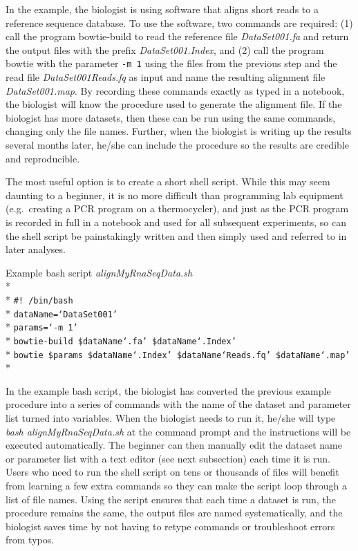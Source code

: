 \documentclass[ChapterTOCs,krantz2]{krantz} %
\begin{document}
In the example, the biologist is using software that aligns short reads
to a reference sequence database.  To use the software, two commands are required:
(1) call the program bowtie-build to read the reference file
\emph{DataSet001.fa} and
return the output files with the prefix \emph{DataSet001.Index},
and (2) call the program bowtie with the parameter \texttt{-m 1} using the files from the
previous step and the read file \emph{DataSet001Reads.fq} as input and name the
resulting alignment file \emph{DataSet001.map}.  By recording these commands exactly
as typed in a notebook, the biologist will know the procedure used to generate
the alignment file.  If the biologist has more datasets, then these can be run
using the same commands, changing only the file names.  Further, when the
biologist is writing up the results several months later, he/she can include
the procedure so the results are credible and reproducible.

The most useful option is to create a short shell script.  While this may seem
daunting to a beginner, it is no more difficult than programming lab
equipment (e.g.\ creating a PCR program on a thermocycler), and just as the PCR
program is recorded in full in a notebook and used for all subsequent
experiments, so can the shell script be painstakingly written and then simply
used and referred to in later analyses.  


Example bash script \emph{alignMyRnaSeqData.sh}\\* \\*
\texttt{\#! /bin/bash}\\*
\texttt{dataName=`DataSet001'}\\*
\texttt{params=`-m 1'}\\*
\texttt{bowtie-build \$dataName`.fa' \$dataName`.Index'}\\*
\texttt{bowtie \$params \$dataName`.Index' \$dataName`Reads.fq' \$dataName`.map' }\\*

In the example bash script, the biologist has converted the
previous example procedure into a series of commands with the name of the
dataset and parameter list turned into variables.  When the biologist needs
to run it, he/she will type \emph{bash alignMyRnaSeqData.sh} at the command prompt and
the instructions will be executed automatically.  The beginner can then
manually edit the dataset name or parameter list with a text editor (see next
subsection) each time it is run.  Users who
need to run the shell script on tens or thousands of files
will benefit from learning a few extra commands so they can make the script
loop through a list of file names.  Using the script ensures that each time a
dataset is run, the procedure remains the same, the output files are named
systematically, and the biologist saves time by not having to retype commands
or troubleshoot errors from typos.
\end{document}
